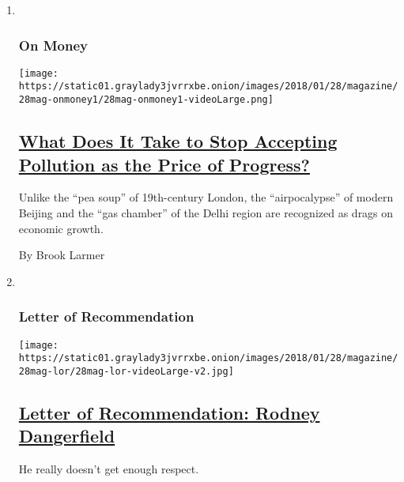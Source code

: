 \begin{enumerate}
\def\labelenumi{\arabic{enumi}.}
\item ~
  \hypertarget{on-money}{%
  \subsubsection{On Money}\label{on-money}}

  \texttt{[image: https://static01.graylady3jvrrxbe.onion/images/2018/01/28/magazine/28mag-onmoney1/28mag-onmoney1-videoLarge.png]}

  \hypertarget{what-does-it-take-to-stop-accepting-pollution-as-the-price-of-progress}{%
  \subsection{\texorpdfstring{\href{/2018/01/23/magazine/what-does-it-take-to-stop-accepting-pollution-as-the-price-of-progress.html}{What
  Does It Take to Stop Accepting Pollution as the Price of
  Progress?}}{What Does It Take to Stop Accepting Pollution as the Price of Progress?}}\label{what-does-it-take-to-stop-accepting-pollution-as-the-price-of-progress}}

  Unlike the ``pea soup'' of 19th-century London, the ``airpocalypse''
  of modern Beijing and the ``gas chamber'' of the Delhi region are
  recognized as drags on economic growth.

  By Brook Larmer
\item ~
  \hypertarget{letter-of-recommendation}{%
  \subsubsection{Letter of
  Recommendation}\label{letter-of-recommendation}}

  \texttt{[image: https://static01.graylady3jvrrxbe.onion/images/2018/01/28/magazine/28mag-lor/28mag-lor-videoLarge-v2.jpg]}

  \hypertarget{letter-of-recommendation-rodney-dangerfield}{%
  \subsection{\texorpdfstring{\href{/2018/01/26/magazine/letter-of-recommendation-rodney-dangerfield.html}{Letter
  of Recommendation: Rodney
  Dangerfield}}{Letter of Recommendation: Rodney Dangerfield}}\label{letter-of-recommendation-rodney-dangerfield}}

  He really doesn't get enough respect.


\end{enumerate}
